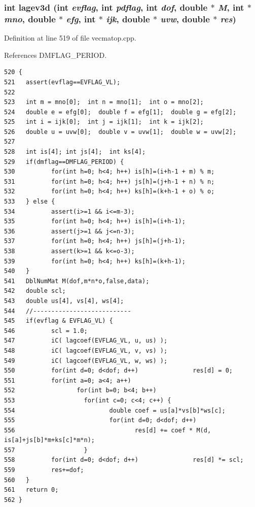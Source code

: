 \subsubsection{\setlength{\rightskip}{0pt plus 5cm}int lagev3d (int {\em evflag}, int {\em pdflag}, int {\em dof}, double $\ast$ {\em M}, int $\ast$ {\em mno}, double $\ast$ {\em efg}, int $\ast$ {\em ijk}, double $\ast$ {\em uvw}, double $\ast$ {\em res})}\label{vecmatop_8hpp_505b660797481226ce76fbe2b50d966f_505b660797481226ce76fbe2b50d966f}




Definition at line 519 of file vecmatop.cpp.

References DMFLAG\_\-PERIOD.

\footnotesize\begin{verbatim}520 {
521   assert(evflag==EVFLAG_VL);
522   
523   int m = mno[0];  int n = mno[1];  int o = mno[2];
524   double e = efg[0];  double f = efg[1];  double g = efg[2];
525   int i = ijk[0];  int j = ijk[1];  int k = ijk[2];
526   double u = uvw[0];  double v = uvw[1];  double w = uvw[2];
527   
528   int is[4]; int js[4];  int ks[4];
529   if(dmflag==DMFLAG_PERIOD) {
530          for(int h=0; h<4; h++) is[h]=(i+h-1 + m) % m;
531          for(int h=0; h<4; h++) js[h]=(j+h-1 + n) % n;
532          for(int h=0; h<4; h++) ks[h]=(k+h-1 + o) % o;
533   } else {
534          assert(i>=1 && i<=m-3);
535          for(int h=0; h<4; h++) is[h]=(i+h-1);
536          assert(j>=1 && j<=n-3);
537          for(int h=0; h<4; h++) js[h]=(j+h-1);
538          assert(k>=1 && k<=o-3);
539          for(int h=0; h<4; h++) ks[h]=(k+h-1);
540   }
541   DblNumMat M(dof,m*n*o,false,data);
542   double scl; 
543   double us[4], vs[4], ws[4];
544   //---------------------------
545   if(evflag & EVFLAG_VL) {
546          scl = 1.0;
547          iC( lagcoef(EVFLAG_VL, u, us) );
548          iC( lagcoef(EVFLAG_VL, v, vs) );
549          iC( lagcoef(EVFLAG_VL, w, ws) );
550          for(int d=0; d<dof; d++)               res[d] = 0;
551          for(int a=0; a<4; a++)
552                 for(int b=0; b<4; b++)
553                   for(int c=0; c<4; c++) {
554                          double coef = us[a]*vs[b]*ws[c]; 
555                          for(int d=0; d<dof; d++)
556                                 res[d] += coef * M(d, is[a]+js[b]*m+ks[c]*m*n);
557                   }
558          for(int d=0; d<dof; d++)               res[d] *= scl;
559          res+=dof;
560   }
561   return 0;
562 }
\end{verbatim}\normalsize 



